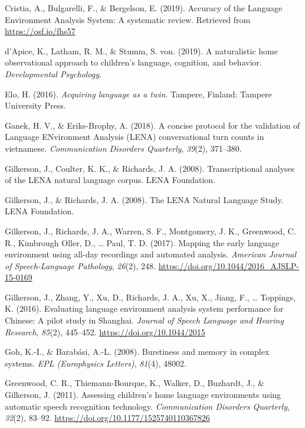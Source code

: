 \documentclass[english,table,man,floatsintext]{apa6}
\begin{document}
\leavevmode\hypertarget{ref-Cristia}{}%
Cristia, A., Bulgarelli, F., \& Bergelson, E. (2019). Accuracy of the Language Environment Analysis System: A systematic review. Retrieved from \url{https://osf.io/fhs57}

\leavevmode\hypertarget{ref-d2019naturalistic}{}%
d'Apice, K., Latham, R. M., \& Stumm, S. von. (2019). A naturalistic home observational approach to children's language, cognition, and behavior. \emph{Developmental Psychology}.

\leavevmode\hypertarget{ref-Elo}{}%
Elo, H. (2016). \emph{Acquiring language as a twin}. Tampere, Finland: Tampere University Press.

\leavevmode\hypertarget{ref-ganek2018concise}{}%
Ganek, H. V., \& Eriks-Brophy, A. (2018). A concise protocol for the validation of Language ENvironment Analysis (LENA) conversational turn counts in vietnamese. \emph{Communication Disorders Quarterly}, \emph{39}(2), 371--380.

\leavevmode\hypertarget{ref-Gilkerson2008ltr6}{}%
Gilkerson, J., Coulter, K. K., \& Richards, J. A. (2008). Transcriptional analyses of the LENA natural language corpus. LENA Foundation.

\leavevmode\hypertarget{ref-gilkerson2008lena}{}%
Gilkerson, J., \& Richards, J. A. (2008). The LENA Natural Language Study. LENA Foundation.

\leavevmode\hypertarget{ref-Gilkerson2017}{}%
Gilkerson, J., Richards, J. A., Warren, S. F., Montgomery, J. K., Greenwood, C. R., Kimbrough Oller, D., \ldots{} Paul, T. D. (2017). Mapping the early language environment using all-day recordings and automated analysis. \emph{American Journal of Speech-Language Pathology}, \emph{26}(2), 248. \url{https://doi.org/10.1044/2016_AJSLP-15-0169}

\leavevmode\hypertarget{ref-Gilkerson2016}{}%
Gilkerson, J., Zhang, Y., Xu, D., Richards, J. A., Xu, X., Jiang, F., \ldots{} Toppings, K. (2016). Evaluating language environment analysis system performance for Chinese: A pilot study in Shanghai. \emph{Journal of Speech Language and Hearing Research}, \emph{85}(2), 445--452. \url{https://doi.org/10.1044/2015}

\leavevmode\hypertarget{ref-goh2008burstiness}{}%
Goh, K.-I., \& Barabási, A.-L. (2008). Burstiness and memory in complex systems. \emph{EPL (Europhysics Letters)}, \emph{81}(4), 48002.

\leavevmode\hypertarget{ref-Greenwood2011}{}%
Greenwood, C. R., Thiemann-Bourque, K., Walker, D., Buzhardt, J., \& Gilkerson, J. (2011). Assessing children's home language environments using automatic speech recognition technology. \emph{Communication Disorders Quarterly}, \emph{32}(2), 83--92. \url{https://doi.org/10.1177/1525740110367826}
\end{document}
